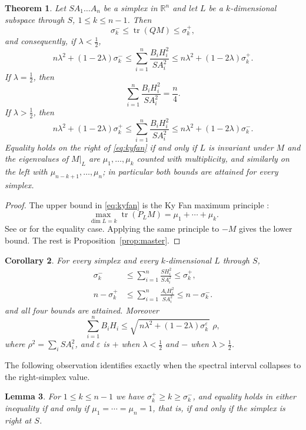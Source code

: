 \documentclass[11pt]{article}
\newtheorem{theorem}{Theorem}[section]
\newtheorem{lemma}[theorem]{Lemma}
\newtheorem{corollary}[theorem]{Corollary}
\theoremstyle{definition}
\theoremstyle{remark}
\DeclareMathOperator{\tr}{tr}
\newcommand{\R}{\mathbb{R}}
\begin{document}
\begin{theorem}\label{thm:kyfan}
Let $SA_1\ldots A_n$ be a simplex in $\R^{n}$ and let $L$ be a $k$-dimensional subspace
through $S$, $1\le k\le n-1$. Then
\begin{equation}\label{eq:kyfan}
\sigma_k^{-}\le\tr(QM)\le\sigma_k^{+},
\end{equation}
and consequently, if $\lambda<\tfrac12$,
\[
n\lambda^{2}+(1-2\lambda)\sigma_k^{-}
\le
\sum_{i=1}^{n}\frac{B_iH_i^{2}}{SA_i^{2}}
\le
n\lambda^{2}+(1-2\lambda)\sigma_k^{+}.
\]
If $\lambda=\tfrac12$, then
\[
\sum_{i=1}^{n}\frac{B_iH_i^{2}}{SA_i^{2}}=\frac n4.
\]
If $\lambda>\tfrac12$, then
\[
n\lambda^{2}+(1-2\lambda)\sigma_k^{+}
\le
\sum_{i=1}^{n}\frac{B_iH_i^{2}}{SA_i^{2}}
\le
n\lambda^{2}+(1-2\lambda)\sigma_k^{-}.
\]
Equality holds on the right of \eqref{eq:kyfan} if and only if $L$ is invariant under $M$
and the eigenvalues of $M|_L$ are $\mu_1,\ldots,\mu_k$ counted with multiplicity, and
similarly on the left with $\mu_{n-k+1},\ldots,\mu_n$; in particular both bounds are
attained for every simplex.
\end{theorem}

\begin{proof}
The upper bound in \eqref{eq:kyfan} is the Ky Fan maximum principle \cite{Fan}:
\[
\max_{\dim L=k}\tr(P_LM)=\mu_1+\cdots+\mu_k.
\]
See \cite[Ch.~III]{Bhatia} or \cite[Ch.~4]{HornJohnson} for the equality case. Applying the
same principle to $-M$ gives the lower bound. The rest is Proposition~\ref{prop:master}.
\end{proof}

\begin{corollary}\label{cor:gramcases}
For every simplex and every $k$-dimensional $L$ through $S$,
\[
\begin{aligned}
\sigma_k^{-}&\le\sum_{i=1}^{n}\frac{SH_i^{2}}{SA_i^{2}}\le\sigma_k^{+},\\
n-\sigma_k^{+}&\le\sum_{i=1}^{n}\frac{A_iH_i^{2}}{SA_i^{2}}\le n-\sigma_k^{-}.
\end{aligned}
\]
and all four bounds are attained. Moreover
\[
\sum_{i=1}^{n}B_iH_i\le\sqrt{\,n\lambda^{2}+(1-2\lambda)\sigma_k^{\varepsilon}\,}\;\rho,
\]
where $\rho^{2}=\sum_i SA_i^{2}$, and $\varepsilon$ is $+$ when $\lambda<\tfrac12$ and $-$ when $\lambda>\tfrac12$.
\end{corollary}

The following observation identifies exactly when the spectral interval collapses to the right-simplex value.

\begin{lemma}\label{lem:interval}
For $1\le k\le n-1$ we have $\sigma_k^{+}\ge k\ge\sigma_k^{-}$, and equality holds in either
inequality if and only if $\mu_1=\cdots=\mu_n=1$, that is, if and only if the simplex is
right at $S$.
\end{lemma}
\end{document}
